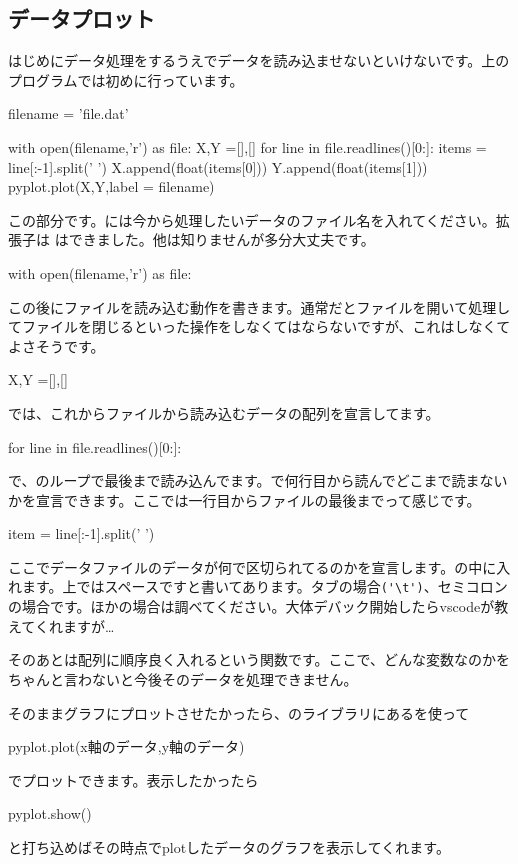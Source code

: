 \documentclass[11pt,b5paper,papersize,dvipdfmx]{jsbook}
\begin{document}
\subsection{データプロット}
はじめにデータ処理をするうえでデータを読み込ませないといけないです。上のプログラムでは初めに行っています。
\begin{kdncode-ii}
    filename = 'file.dat'
    
    with open(filename,'r') as file:
        X,Y =[],[]
        for line in file.readlines()[0:]:
            items = line[:-1].split(' ')
            X.append(float(items[0]))
            Y.append(float(items[1]))
    pyplot.plot(X,Y,label = filename)
\end{kdncode-ii}
この部分です。には今から処理したいデータのファイル名を入れてください。拡張子は  はできました。他は知りませんが多分大丈夫です。
\begin{kdncode-i}
    with open(filename,'r') as file:
\end{kdncode-i}
この後にファイルを読み込む動作を書きます。通常だとファイルを開いて処理してファイルを閉じるといった操作をしなくてはならないですが、これはしなくてよさそうです。
\begin{kdncode-i}
    X,Y =[],[]
\end{kdncode-i}
では、これからファイルから読み込むデータの配列を宣言してます。
\begin{kdncode-i}
    for line in file.readlines()[0:]:
\end{kdncode-i}
で、のループで最後まで読み込んでます。で何行目から読んでどこまで読まないかを宣言できます。ここでは一行目からファイルの最後までって感じです。
\begin{kdncode-i}
    item = line[:-1].split(' ')
\end{kdncode-i}
ここでデータファイルのデータが何で区切られてるのかを宣言します。の中に入れます。上ではスペースですと書いてあります。タブの場合\verb|('\t')|、セミコロンの場合です。ほかの場合は調べてください。大体デバック開始したらvscodeが教えてくれますが…\par
そのあとは配列に順序良く入れるという関数です。ここで、どんな変数なのかをちゃんと言わないと今後そのデータを処理できません。\par
そのままグラフにプロットさせたかったら、のライブラリにあるを使って
\begin{kdncode-i}
    pyplot.plot(x軸のデータ,y軸のデータ)
\end{kdncode-i}
でプロットできます。表示したかったら
\begin{kdncode-i}
    pyplot.show()
\end{kdncode-i}
と打ち込めばその時点でplotしたデータのグラフを表示してくれます。
\end{document}
